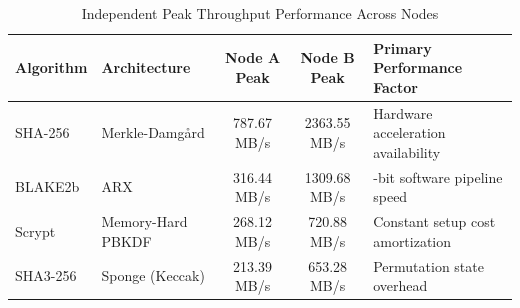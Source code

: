 \documentclass[11pt,a4paper,oneside]{book}
\begin{document}
\begin{table}[H]
    \centering
    \caption{Independent Peak Throughput Performance Across Nodes}
    \label{tab:throughput}
    \vspace{0.4em}
    \begin{tabularx}{\textwidth}{@{}l l c c >{\raggedright\arraybackslash}X@{}}
        \toprule
        \textbf{Algorithm} & \textbf{Architecture} & \textbf{Node A Peak} & \textbf{Node B Peak} & \textbf{Primary Performance Factor} \\
        \midrule
        SHA-256            & Merkle-Damg{\aa}rd    & 787.67 MB/s          & 2363.55 MB/s         & Hardware acceleration availability  \\
        BLAKE2b            & ARX                   & 316.44 MB/s          & 1309.68 MB/s         & 64-bit software pipeline speed      \\
        Scrypt             & Memory-Hard PBKDF     & 268.12 MB/s          & 720.88 MB/s          & Constant setup cost amortization    \\
        SHA3-256           & Sponge (Keccak)       & 213.39 MB/s          & 653.28 MB/s          & Permutation state overhead          \\
        \bottomrule
    \end{tabularx}
\end{table}
\end{document}
